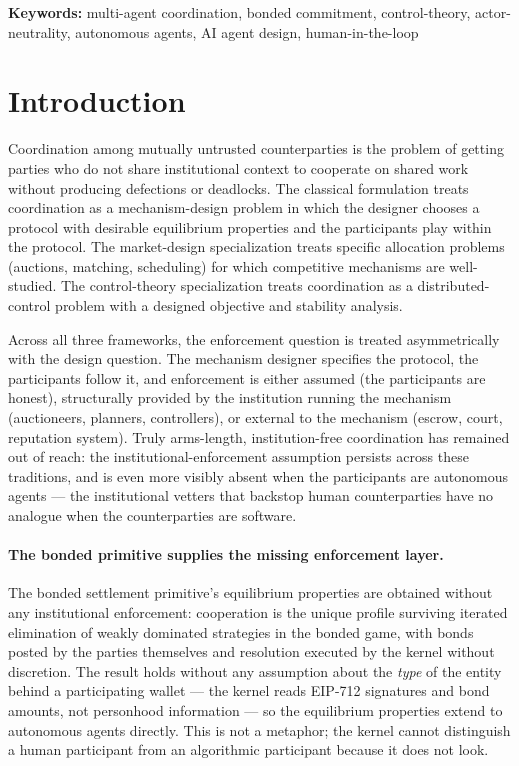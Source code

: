\documentclass[11pt,a4paper]{article}
\theoremstyle{definition}
\theoremstyle{remark}
\begin{document}
\medskip
\noindent\textbf{Keywords:}
multi-agent coordination, bonded commitment, control-theory,
actor-neutrality, autonomous agents, AI agent design,
human-in-the-loop

\section{Introduction}
\label{sec:intro}

Coordination among mutually untrusted counterparties is the problem
of getting parties who do not share institutional context to
cooperate on shared work without producing defections or deadlocks.
The classical formulation
\citep{shoham_leyton_brown_2009, parkes_seuken_2024} treats
coordination as a mechanism-design problem in which the designer
chooses a protocol with desirable equilibrium properties and the
participants play within the protocol. The market-design
specialization \citep{milgrom_2017} treats specific allocation
problems (auctions, matching, scheduling) for which competitive
mechanisms are well-studied. The control-theory specialization
\citep{khalil_2002, bertsekas_2005} treats coordination as a
distributed-control problem with a designed objective and
stability analysis.

Across all three frameworks, the enforcement question is treated
asymmetrically with the design question. The mechanism designer
specifies the protocol, the participants follow it, and enforcement
is either assumed (the participants are honest), structurally
provided by the institution running the mechanism (auctioneers,
planners, controllers), or external to the mechanism (escrow,
court, reputation system). Truly arms-length, institution-free
coordination has remained out of reach: the institutional-enforcement
assumption persists across these traditions, and is even more visibly
absent when the participants are autonomous agents — the institutional
vetters that backstop human counterparties have no analogue when
the counterparties are software.

\paragraph{The bonded primitive supplies the missing enforcement layer.}
The bonded settlement primitive's equilibrium properties are obtained
without any institutional enforcement: cooperation is the unique
profile surviving iterated elimination of weakly dominated
strategies in the bonded game, with bonds posted by the parties
themselves and resolution executed by the kernel without
discretion. The result holds without any assumption about the
\emph{type} of the entity behind a participating wallet --- the
kernel reads EIP-712 signatures and bond amounts, not personhood
information --- so the equilibrium properties extend to autonomous
agents directly. This is not a metaphor; the kernel cannot
distinguish a human participant from an algorithmic participant
because it does not look.
\end{document}
